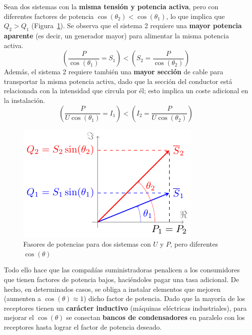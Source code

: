 \documentclass[11pt]{book} %
\begin{document}
	Sean dos sistemas con la \textbf{misma tensión y potencia activa}, pero con diferentes factores de potencia $\cos(\theta_2) < \cos(\theta_1)$, lo que implica que $Q_2 > Q_1$ (Figura~\ref{fig.fasorescompensacionreactiva}). Se observa que el sistema 2 requiere una \textbf{mayor potencia aparente} (es decir, un generador mayor) para alimentar la misma potencia activa.
	\begin{equation*}
		\left(\dfrac{P}{\cos(\theta_1)} = S_1 \right) < \left( S_2 = \dfrac{P}{\cos (\theta_2)}\right) 
	\end{equation*}
	Además, el sistema 2 requiere también una \textbf{mayor sección} de cable para transportar la misma potencia activa, dado que la sección del conductor está relacionada con la intensidad que circula por él; esto implica un coste adicional en la instalación.
	\begin{equation*}
		\left(\frac{P}{U \cos (\theta_1)} = I_1 \right) < \left( I_2 = \frac{P}{U \cos (\theta_2)}\right) 
	\end{equation*}
	\begin{figure}[htbp]
		\centering
		\includegraphics{../figs/fasorescompensacionreactiva.pdf}
		\caption{Fasores de potencias para dos sistemas con $U$ y $P$, pero diferentes $\cos(\theta)$}
		\label{fig.fasorescompensacionreactiva}
	\end{figure} 
	
	Todo ello hace que las compañías suministradoras penalicen a los consumidores que tienen factores de potencia bajos, haciéndoles pagar una tasa adicional. De hecho, en determinados casos, se obliga a instalar elementos que mejoren (aumenten a $\cos(\theta)\approx 1$) dicho factor de potencia. Dado que la mayoría de los receptores tienen un \textbf{carácter inductivo} (máquinas eléctricas industriales), para mejorar el $\cos(\theta)$ se conectan \textbf{bancos de condensadores} en paralelo con los receptores hasta lograr el factor de potencia deseado.
	
\end{document}
